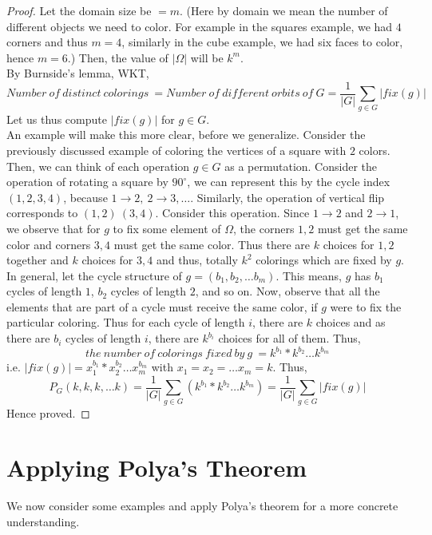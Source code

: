 \begin{proof}
Let the domain size be $= m$. (Here by domain we mean the number of different objects we need to color. For example in the squares example, we had $4$ corners and thus $m = 4$, similarly in the cube example, we had six faces to color, hence $m = 6$.) Then, the value of $|\Omega|$ will be $k^m$.
\\
By Burnside's lemma, WKT, 
$$Number\ of\ distinct\ colorings\ = Number\ of\ different\ orbits\ of\ G = \frac{1}{|G|} \sum_{g\in G}|fix(g)|$$
Let us thus compute $|fix(g)|$ for $g \in G$. 
\\
An example will make this more clear, before we generalize. Consider the previously discussed example of coloring the vertices of a square with $2$ colors. Then, we can think of each operation $g \in G$ as a permutation. Consider the operation of rotating a square by $90^{\circ}$, we can represent this by the cycle index $(1, 2, 3, 4)$, because $1 \rightarrow 2,\ 2 \rightarrow 3, \ldots$. Similarly, the operation of vertical flip corresponds to $(1, 2)\ (3, 4)$. Consider this operation. Since $1 \rightarrow 2$ and $2 \rightarrow 1$, we observe that for $g$ to fix some element of $\Omega$, the corners $1, 2$ must get the same color and corners $3, 4$ must get the same color. Thus there are $k$ choices for $1, 2$ together and $k$ choices for $3, 4$ and thus, totally $k^2$ colorings which are fixed by $g$.
\\
In general, let the cycle structure of $g = (b_1, b_2, \ldots b_m)$. This means, $g$ has $b_1$ cycles of length $1$, $b_2$ cycles of length $2$, and so on. Now, observe that all the elements that are part of a cycle must receive the same color, if $g$ were to fix the particular coloring. Thus for each cycle of length $i$, there are $k$ choices and as there are $b_i$ cycles of length $i$, there are $k^{b_i}$ choices for all of them. Thus, 
$$ the\ number\ of\ colorings\ fixed\ by\ g\ = k^{b_1} * k^{b_2} \ldots k^{b_m}$$
i.e. $|fix(g)| = x_1^{b_1} * x_2^{b_2} \ldots x_m^{b_m}$ with $x_1 = x_2 = \ldots x_m = k$.
Thus, 
$$P_G(k, k, k, \ldots k) = \frac{1}{|G|} \sum_{g\in G}(k^{b_1} * k^{b_2} \ldots k^{b_m}) = \frac{1}{|G|} \sum_{g\in G}|fix(g)|$$
Hence proved.
\end{proof}

\section{Applying Polya's Theorem}
We now consider some examples and apply Polya's theorem for a more concrete understanding.
